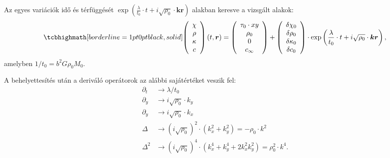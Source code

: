 \documentclass[10pt,a4paper]{scrartcl}
\let\mathbf\bm
\begin{document}
Az egyes variációk idő és térfüggését $\exp \left( {\frac{\lambda }{{{t_0}}} \cdot t + i\sqrt {{\rho _0}}  \cdot {\mathbf{kr}}} \right)$ alakban keresve a vizsgált alakok:
\begin{gather}
\tcbhighmath[borderline={1pt}{0pt}{black,solid}]{
\left( {\begin{array}{*{20}{c}}
  \chi  \\ 
  \rho  \\ 
  \kappa  \\ 
  c 
\end{array}} \right)\left( {t,{\mathbf{r}}} \right) = \left( {\begin{array}{*{20}{c}}
  {{\tau _0} \cdot xy} \\ 
  {{\rho _0}} \\ 
  0 \\ 
  {{c_\infty }} 
\end{array}} \right) + \left( {\begin{array}{*{20}{c}}
  {\delta {\chi _0}} \\ 
  {\delta {\rho _0}} \\ 
  {\delta {\kappa _0}} \\ 
  {\delta {c_0}} 
\end{array}} \right) \cdot \exp \left( {\frac{\lambda }{{{t_0}}} \cdot t + i\sqrt {{\rho _0}}  \cdot {\mathbf{kr}}} \right),}
\end{gather}
amelyben $1/{t_0} = {b^2}G{\rho _0}{M_0}$.

A behelyettesítés után a deriváló operátorok az alábbi sajátértéket veszik fel:
\[\begin{aligned}
  {\partial _t} &  \to \lambda /t_0 \\ 
  {\partial _y} &  \to i\sqrt {{\rho _0}}  \cdot {k_y} \\ 
  {\partial _y} &  \to i\sqrt {{\rho _0}}  \cdot {k_x} \\ 
  \Delta  &  \to {\left( {i\sqrt {{\rho _0}} } \right)^2} \cdot \left( {k_x^2 + k_y^2} \right) =  - {\rho _0} \cdot {k^2} \\ 
  {\Delta ^2} &  \to {\left( {i\sqrt {{\rho _0}} } \right)^4} \cdot \left( {k_x^4 + k_y^4 + 2k_x^2k_y^2} \right) = \rho _0^2 \cdot {k^4}. 
\end{aligned} \]
\end{document}
